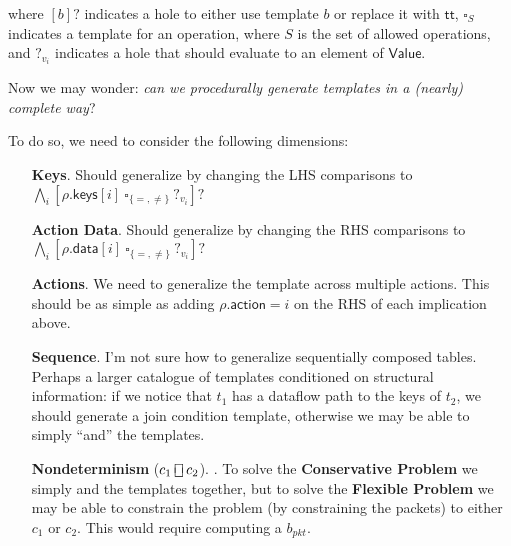 \documentclass{article}
\newcommand{\TRUE}{\mathsf{tt}}
\newcommand{\Value}{\mathsf{Value}}
\newcommand{\action}{\mathsf{action}}
\newcommand{\keys}{\mathsf{keys}}
\newcommand{\data}{\mathsf{data}}
\newcommand{\choiceop}{\rotatebox[origin=c]{90}{$\sqsubset\!\!\!\sqsupset$}}
\newcommand{\choice}{\mathbin{\choiceop}}
\begin{document}
where $[b]?$ indicates a hole to either use template $b$ or replace it with
$\TRUE$, $\square_S$ indicates a template for an operation, where $S$ is the set
of allowed operations, and $?_{v_i}$ indicates a hole that should evaluate to an element
of $\Value$.

Now we may wonder: \emph{can we procedurally generate templates in a (nearly) complete way}?

To do so, we need to consider the following dimensions:
\begin{enumerate}[align=left]
\item[\textbf{Keys}.] Should generalize by changing the LHS comparisons to $
  \bigwedge_i[\rho.\keys[i]~\square_{\{=,\neq\}}~?_{v_i}]?$
\item[\textbf{Action Data}.] Should generalize by changing the RHS comparisons to $\bigwedge_i[\rho.\data[i]~\square_{\{=,\neq\}}~?_{v_i}]?$
\item[\textbf{Actions}.] We need to generalize the template across multiple actions. This should be as simple as adding $\rho.\action = i$ on the RHS of each implication above.
\item[\textbf{Sequence}.] I'm not sure how to generalize sequentially composed tables.
  Perhaps a larger catalogue of templates conditioned on structural information:
  if we notice that $t_1$ has a dataflow path to the keys of $t_2$, we should
  generate a join condition template, otherwise we may be able to simply ``and'' the templates.

\item[\textbf{Nondeterminism} ($c_1 \choice c_2$).]. To solve the \textbf{Conservative
  Problem} we simply and the templates together, but to solve the
  \textbf{Flexible Problem} we may be able to constrain the problem (by
  constraining the packets) to either $c_1$ or $c_2$. This would require
  computing a $b_{\textit{pkt}}$.
\end{enumerate}
\end{document}

